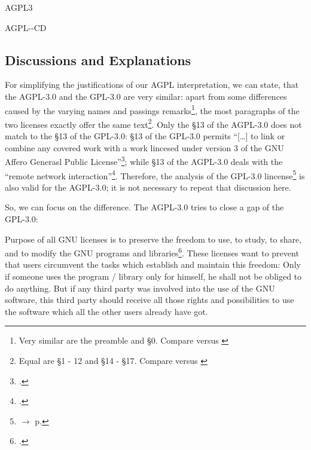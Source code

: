 \begin{license}{AGPL3}
\begin{lsuc}{AGPL-\ver-CD}
  \begin{lsucprohibits}
    \lsucitem{\noPatentLitigation}
  \end{lsucprohibits}
\end{lsuc}
\end{license}


\subsection{Discussions and Explanations}
\label{AGPL3Discussion}
  
For simplifying the justifications of our AGPL interpretation, we can state,
that the AGPL-3.0 and the GPL-3.0 are very similar: apart from some differences
caused by the varying names and passings remarks\footnote{Very similar are the
preamble and §0.  Compare \cite[][\nopage wp.]{Gpl30OsiLicense2007a} versus
\cite[][\nopage wp.]{Agpl30OsiLicense2007a}}, the most paragraphs of the two
licenses exactly offer the same text\footnote{Equal are §1 - 12 and §14 - §17.
Compare \cite[][\nopage wp.]{Gpl30OsiLicense2007a} versus \cite[][\nopage
wp.]{Agpl30OsiLicense2007a}}. Only the §13 of the AGPL-3.0 does not match to the
§13 of the GPL-3.0: §13 of the GPL-3.0 permits \enquote{[\ldots] to link or
combine any covered work with a work lincesed under version 3 of the GNU Affero
Generasl Public License}\footcite[cf.][\nopage wp. §13]{Gpl30OsiLicense2007a};
while §13 of the AGPL-3.0 deals with the \enquote{remote network
interaction}\footcite[cf.][\nopage wp. §13]{Agpl30OsiLicense2007a}. Therefore,
the analysis of the GPL-3.0 lincense\footnote{$\rightarrow$ p.
\pageref{GPL3Discussion}} is also valid for the AGPL-3.0; it is not necessary to
repeat that discussion here.

So, we can focus on the difference. The AGPL-3.0 tries to close a gap of the
GPL-3.0:

Purpose of all GNU licenses is to preserve the freedom to use, to study, to
share, and to modify the GNU programs and libraries\footcite[cf.][\nopage
wp.]{FsfFreeSoftware2015a}. These licenses want to prevent that users circumvent
the tasks which establish and maintain this freedom: Only if someone uses the
program / library only for himself, he shall not be obliged to do anything. But
if any third party was involved into the use of the GNU software, this third
party should receive all those rights and possibilities to use the software
which all the other users already have got.

